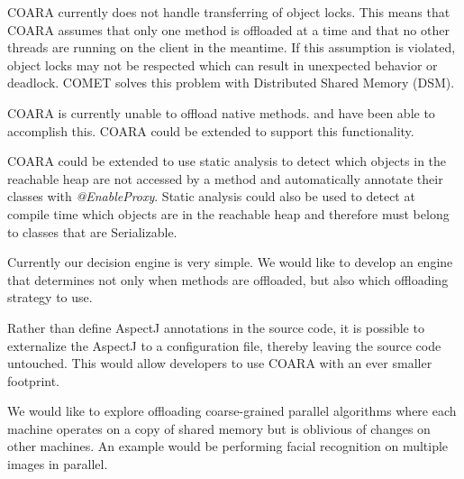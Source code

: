 \documentclass[10pt,journal,cspaper,compsoc]{IEEEtran}
\begin{document}
{COARA currently does not handle transferring of object locks.  This means that COARA assumes that only one method is offloaded at a time and that no other threads are running on the client in the meantime.  If this assumption is violated, object locks may not be respected which can result in unexpected behavior or deadlock.  COMET \cite{Gordon:2012vu} solves this problem with Distributed Shared Memory (DSM).

COARA is currently unable to offload native methods. \cite{Cuervo:2010:MMS:1814433.1814441} and \cite{Gordon:2012vu} have been able to accomplish this.  COARA could be extended to support this functionality.

COARA could be extended to use static analysis to detect which objects in the reachable heap are not accessed by a method and automatically annotate their classes with \emph{@EnableProxy}.  Static analysis could also be used to detect at compile time which objects are in the reachable heap and therefore must belong to classes that are Serializable.

Currently our decision engine is very simple.  We would like to develop an engine that determines not only when methods are offloaded, but also which offloading strategy to use.

Rather than define AspectJ annotations in the source code, it is possible to externalize the AspectJ to a configuration file, thereby leaving the source code untouched.  This would allow developers to use COARA with an ever smaller footprint.

We would like to explore offloading coarse-grained parallel algorithms where each machine operates on a copy of shared memory but is oblivious of changes on other machines.  An example would be performing facial recognition on multiple images in parallel.


}
\end{document}

